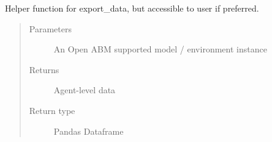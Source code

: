 \documentclass[letterpaper,10pt,english]{sphinxmanual}
\begin{document}
\begin{fulllineitems}
\label{\detokenize{index:oabm_tools.export_agent_data}}
Helper function for export\_data, but accessible to user if preferred.
\begin{quote}\begin{description}
\item[{Parameters}] \leavevmode
{} \textendash{} An Open ABM supported model / environment instance

\item[{Returns}] \leavevmode
Agent-level data

\item[{Return type}] \leavevmode
Pandas Dataframe

\end{description}\end{quote}

\end{fulllineitems}

\end{document}
